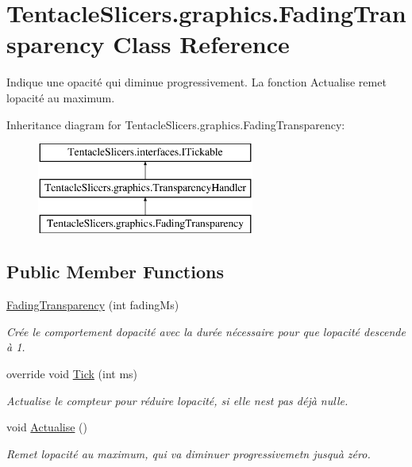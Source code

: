\hypertarget{class_tentacle_slicers_1_1graphics_1_1_fading_transparency}{}\section{Tentacle\+Slicers.\+graphics.\+Fading\+Transparency Class Reference}
\label{class_tentacle_slicers_1_1graphics_1_1_fading_transparency}


Indique une opacité qui diminue progressivement. La fonction Actualise remet l\textquotesingle{}opacité au maximum.  


Inheritance diagram for Tentacle\+Slicers.\+graphics.\+Fading\+Transparency\+:\begin{figure}[H]
\begin{center}
\leavevmode
\includegraphics[height=3.000000cm]{class_tentacle_slicers_1_1graphics_1_1_fading_transparency}
\end{center}
\end{figure}
\subsection*{Public Member Functions}
\begin{DoxyCompactItemize}
\item 
\hyperlink{class_tentacle_slicers_1_1graphics_1_1_fading_transparency_a1327bc9549046d3b5562d0e92b742129}{Fading\+Transparency} (int fading\+Ms)
\begin{DoxyCompactList}\small\item\em Crée le comportement d\textquotesingle{}opacité avec la durée nécessaire pour que l\textquotesingle{}opacité descende à 1. \end{DoxyCompactList}\item 
override void \hyperlink{class_tentacle_slicers_1_1graphics_1_1_fading_transparency_a0558563624c4749be727bfd0aefb293e}{Tick} (int ms)
\begin{DoxyCompactList}\small\item\em Actualise le compteur pour réduire l\textquotesingle{}opacité, si elle n\textquotesingle{}est pas déjà nulle. \end{DoxyCompactList}\item 
void \hyperlink{class_tentacle_slicers_1_1graphics_1_1_fading_transparency_a7fb444b5436abb825cdf7570e937b345}{Actualise} ()
\begin{DoxyCompactList}\small\item\em Remet l\textquotesingle{}opacité au maximum, qui va diminuer progressivemetn jusqu\textquotesingle{}à zéro. \end{DoxyCompactList}\end{DoxyCompactItemize}
